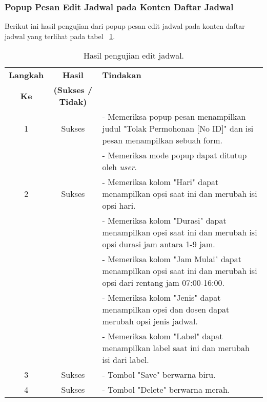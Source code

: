 \subsubsection{Popup Pesan Edit Jadwal pada Konten Daftar Jadwal}
Berikut ini hasil pengujian dari popup pesan edit jadwal pada konten daftar jadwal yang terlihat pada tabel ~\ref{hasil:EditJadwal}.
\begin{table}[H]
	\centering 
	\caption{Hasil pengujian edit jadwal.}
	\label{hasil:EditJadwal}
	\begin{tabular}{|c| c| p{}|}
		\toprule
		\textbf{Langkah} & \textbf{Hasil} & \textbf{Tindakan}\\
		\textbf{Ke} & \textbf{(Sukses / Tidak)} &\\
		\midrule
		1&Sukses& - Memeriksa popup pesan menampilkan judul "Tolak Permohonan [No ID]" dan isi pesan menampilkan sebuah form.\\
		&& - Memeriksa mode popup dapat ditutup oleh \textit{user}.\\
		\hline
		2&Sukses& - Memeriksa kolom "Hari" dapat menampilkan opsi saat ini dan merubah isi opsi hari.\\
		&& - Memeriksa kolom "Durasi" dapat menampilkan opsi saat ini dan merubah isi  opsi durasi jam antara 1-9 jam.\\
		&& - Memeriksa kolom "Jam Mulai" dapat menampilkan opsi saat ini dan merubah isi opsi dari rentang jam 07:00-16:00.\\
		&& - Memeriksa kolom "Jenis" dapat menampilkan opsi dan dosen dapat merubah opsi jenis jadwal.\\
		&& - Memeriksa kolom "Label" dapat menampilkan label saat ini dan merubah isi dari label.\\
		\hline
		3&Sukses&- Tombol "Save" berwarna biru.\\
		\hline
		4&Sukses&- Tombol "Delete" berwarna merah.\\	
		\bottomrule		
	\end{tabular} 
\end{table}

